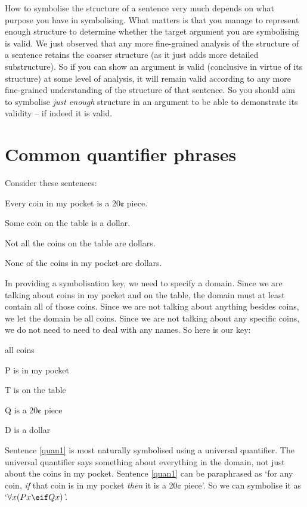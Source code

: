 How to symbolise the structure of a sentence very much depends on what purpose you have in symbolising. What matters is that you manage to represent enough structure to determine whether the target argument you are symbolising is valid. We just observed that any more fine-grained analysis of the structure of a sentence retains the coarser structure (as it just adds more detailed substructure). So if you can show an argument is valid (conclusive in virtue of its structure) at some level of analysis, it will remain valid according to any more fine-grained understanding of the structure of that sentence. So you should aim to symbolise \emph{just enough} structure in an argument to be able to demonstrate its validity – if indeed it is valid.

\section{Common quantifier phrases}
Consider these sentences:
	\begin{earg}
		\item[\ex{quan1}] Every coin in my pocket is a 20¢ piece.
		\item[\ex{quan2}] Some coin on the table is a dollar.
		\item[\ex{quan3}] Not all the coins on the table are dollars.
		\item[\ex{quan4}] None of the coins in my pocket are dollars.
	\end{earg}
In providing a symbolisation key, we need to specify a domain. Since we are talking about coins in my pocket and on the table, the domain must at least contain all of those coins. Since we are not talking about anything besides coins, we let the domain be all coins. Since we are not talking about any specific coins, we do not need to need to deal with any names. So here is our key:
	\begin{ekey}
		\item[\text{domain}] all coins
		\item[P]  is in my pocket
		\item[T]  is on the table
		\item[Q]  is a 20¢ piece
		\item[D]  is a dollar
	\end{ekey}
Sentence \ref{quan1} is most naturally symbolised using a universal quantifier. The universal quantifier says something about everything in the domain, not just about the coins in my pocket. Sentence \ref{quan1} can be paraphrased as `for any coin, \emph{if} that coin is in my pocket \emph{then} it is a 20¢ piece'. So we can symbolise it as `$\forall x(Px \eif Qx)$'.


